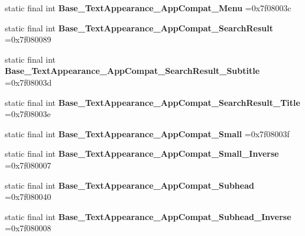 \begin{DoxyCompactItemize}
\item 
\hypertarget{classcheck_1_1test_1_1_r_1_1style_a5abddc786b2ce11957b9c9f2794fd80b}{}static final int {\bfseries Base\+\_\+\+Text\+Appearance\+\_\+\+App\+Compat\+\_\+\+Menu} =0x7f08003c\label{classcheck_1_1test_1_1_r_1_1style_a5abddc786b2ce11957b9c9f2794fd80b}

\item 
\hypertarget{classcheck_1_1test_1_1_r_1_1style_a09b633323c8229b88d746767a1f2adf2}{}static final int {\bfseries Base\+\_\+\+Text\+Appearance\+\_\+\+App\+Compat\+\_\+\+Search\+Result} =0x7f080089\label{classcheck_1_1test_1_1_r_1_1style_a09b633323c8229b88d746767a1f2adf2}

\item 
\hypertarget{classcheck_1_1test_1_1_r_1_1style_a70147a8a83fd5f04808a91a5d2829a78}{}static final int {\bfseries Base\+\_\+\+Text\+Appearance\+\_\+\+App\+Compat\+\_\+\+Search\+Result\+\_\+\+Subtitle} =0x7f08003d\label{classcheck_1_1test_1_1_r_1_1style_a70147a8a83fd5f04808a91a5d2829a78}

\item 
\hypertarget{classcheck_1_1test_1_1_r_1_1style_a16772383ef71704cf1b8fb306c26a1f4}{}static final int {\bfseries Base\+\_\+\+Text\+Appearance\+\_\+\+App\+Compat\+\_\+\+Search\+Result\+\_\+\+Title} =0x7f08003e\label{classcheck_1_1test_1_1_r_1_1style_a16772383ef71704cf1b8fb306c26a1f4}

\item 
\hypertarget{classcheck_1_1test_1_1_r_1_1style_a54de5d881005e1a1fd60b061364aa0e3}{}static final int {\bfseries Base\+\_\+\+Text\+Appearance\+\_\+\+App\+Compat\+\_\+\+Small} =0x7f08003f\label{classcheck_1_1test_1_1_r_1_1style_a54de5d881005e1a1fd60b061364aa0e3}

\item 
\hypertarget{classcheck_1_1test_1_1_r_1_1style_a8daf8a76aadcd56a17eb952df1c7a05d}{}static final int {\bfseries Base\+\_\+\+Text\+Appearance\+\_\+\+App\+Compat\+\_\+\+Small\+\_\+\+Inverse} =0x7f080007\label{classcheck_1_1test_1_1_r_1_1style_a8daf8a76aadcd56a17eb952df1c7a05d}

\item 
\hypertarget{classcheck_1_1test_1_1_r_1_1style_a61b8708e0188da68c26accf58b5efd7f}{}static final int {\bfseries Base\+\_\+\+Text\+Appearance\+\_\+\+App\+Compat\+\_\+\+Subhead} =0x7f080040\label{classcheck_1_1test_1_1_r_1_1style_a61b8708e0188da68c26accf58b5efd7f}

\item 
\hypertarget{classcheck_1_1test_1_1_r_1_1style_ae1c1e1f374603df3adba4f2616f65334}{}static final int {\bfseries Base\+\_\+\+Text\+Appearance\+\_\+\+App\+Compat\+\_\+\+Subhead\+\_\+\+Inverse} =0x7f080008\label{classcheck_1_1test_1_1_r_1_1style_ae1c1e1f374603df3adba4f2616f65334}


\end{DoxyCompactItemize}
